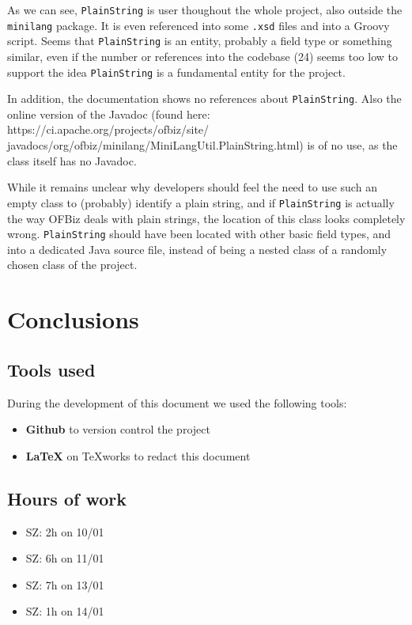 \documentclass[11pt]{article} %
\begin{document}


As we can see, \texttt{PlainString} is user thoughout the whole project, also outside the \texttt{minilang} package. It is even referenced into some \texttt{.xsd} files and into a Groovy script. Seems that \texttt{PlainString} is an entity, probably a field type or something similar, even if the number or references into the codebase (24) seems too low to support the idea \texttt{PlainString} is a fundamental entity for the project.

In addition, the documentation shows no references about \texttt{PlainString}. Also the online version of the Javadoc (found here: https://ci.apache.org/projects/ofbiz/site/ javadocs/org/ofbiz/minilang/MiniLangUtil.PlainString.html) is of no use, as the class itself has no Javadoc.

While it remains unclear why developers should feel the need to use such an empty class to (probably) identify a plain string, and if \texttt{PlainString} is actually the way OFBiz deals with plain strings, the location of this class looks completely wrong.  \texttt{PlainString} should have been located with other basic field types, and into a dedicated Java source file, instead of being a nested class of a randomly chosen class of the project.


\section{Conclusions}

\subsection{Tools used}
During the development of this document we used the following tools:
\begin{itemize}
	\item \textbf{Github} to version control the project
	\item \textbf{\LaTeX} on TeXworks to redact this document
\end{itemize}

\subsection{Hours of work}
\begin{itemize}
	\item SZ: 2h on 10/01
	\item SZ: 6h on 11/01
	\item SZ: 7h on 13/01
	\item SZ: 1h on 14/01
\end{itemize}
\end{document}
